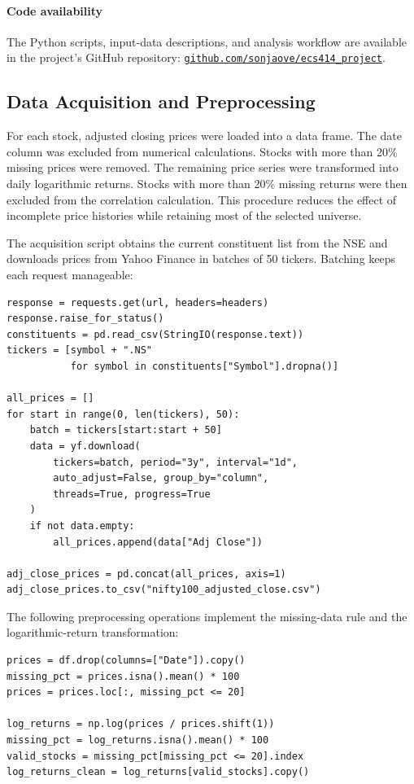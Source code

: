 \documentclass[12pt]{article}
\numberwithin{equation}{section}
\begin{document}
\paragraph{Code availability}
The Python scripts, input-data descriptions, and analysis workflow are
available in the project's GitHub repository:
\href{https://github.com/sonjaove/ecs414_project}
{\texttt{github.com/sonjaove/ecs414\_project}}.

\subsection{Data Acquisition and Preprocessing}
For each stock, adjusted closing prices were loaded into a data frame. The
date column was excluded from numerical calculations. Stocks with more than
20\% missing prices were removed. The remaining price series were transformed
into daily logarithmic returns. Stocks with more than 20\% missing returns were
then excluded from the correlation calculation. This procedure reduces the
effect of incomplete price histories while retaining most of the selected
universe.

The acquisition script obtains the current constituent list from the NSE and
downloads prices from Yahoo Finance in batches of 50 tickers. Batching keeps
each request manageable:

\begin{lstlisting}[caption={Downloading adjusted-close prices in batches.}]
response = requests.get(url, headers=headers)
response.raise_for_status()
constituents = pd.read_csv(StringIO(response.text))
tickers = [symbol + ".NS"
           for symbol in constituents["Symbol"].dropna()]

all_prices = []
for start in range(0, len(tickers), 50):
    batch = tickers[start:start + 50]
    data = yf.download(
        tickers=batch, period="3y", interval="1d",
        auto_adjust=False, group_by="column",
        threads=True, progress=True
    )
    if not data.empty:
        all_prices.append(data["Adj Close"])

adj_close_prices = pd.concat(all_prices, axis=1)
adj_close_prices.to_csv("nifty100_adjusted_close.csv")
\end{lstlisting}

The following preprocessing operations implement the missing-data rule and
the logarithmic-return transformation:

\begin{lstlisting}[caption={Cleaning prices and calculating returns.}]
prices = df.drop(columns=["Date"]).copy()
missing_pct = prices.isna().mean() * 100
prices = prices.loc[:, missing_pct <= 20]

log_returns = np.log(prices / prices.shift(1))
missing_pct = log_returns.isna().mean() * 100
valid_stocks = missing_pct[missing_pct <= 20].index
log_returns_clean = log_returns[valid_stocks].copy()
\end{lstlisting}
\end{document}
